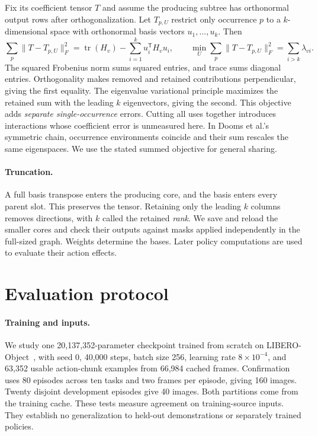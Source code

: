 \documentclass{article}
\begin{document}
Fix its coefficient tensor $T$ and assume the producing subtree has orthonormal output rows after orthogonalization. Let $T_{p,U}$ restrict only occurrence $p$ to a $k$-dimensional space with orthonormal basis vectors $u_1,\ldots,u_k$. Then
\begin{equation}
 \sum_p\|T-T_{p,U}\|_F^2
 =\operatorname{tr}(H_v)-\sum_{i=1}^k u_i^{\mathsf T}H_vu_i,
 \qquad \min_U\sum_p\|T-T_{p,U}\|_F^2=\sum_{i>k}\lambda_{vi}.
 \label{eq.objective}
\end{equation}
The squared Frobenius norm sums squared entries, and trace sums diagonal entries. Orthogonality makes removed and retained contributions perpendicular, giving the first equality. The eigenvalue variational principle maximizes the retained sum with the leading $k$ eigenvectors, giving the second. This objective adds \emph{separate single-occurrence} errors. Cutting all uses together introduces interactions whose coefficient error is unmeasured here. In Dooms et al.'s symmetric chain, occurrence environments coincide and their sum rescales the same eigenspaces. We use the stated summed objective for general sharing.

\paragraph{Truncation.}
A full basis transpose enters the producing core, and the basis enters every parent slot. This preserves the tensor. Retaining only the leading $k$ columns removes directions, with $k$ called the retained \emph{rank}. We save and reload the smaller cores and check their outputs against masks applied independently in the full-sized graph. Weights determine the bases. Later policy computations are used to evaluate their action effects.

\section{Evaluation protocol}
\label{sec.setup}

\paragraph{Training and inputs.}
We study one 20,137,352-parameter checkpoint trained from scratch on LIBERO-Object~\citep{liu2023}, with seed 0, 40,000 steps, batch size 256, learning rate $8\times10^{-4}$, and 63,352 usable action-chunk examples from 66,984 cached frames. Confirmation uses 80 episodes across ten tasks and two frames per episode, giving 160 images. Twenty disjoint development episodes give 40 images. Both partitions come from the training cache. These tests measure agreement on training-source inputs. They establish no generalization to held-out demonstrations or separately trained policies.
\end{document}
